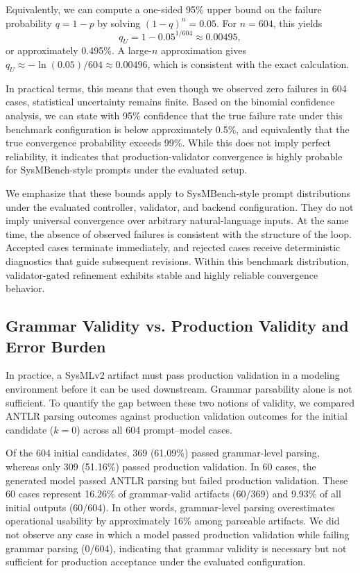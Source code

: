 Equivalently, we can compute a one-sided 95\% upper bound on the failure probability $q=1-p$ by solving $(1-q)^n=0.05$. For $n=604$, this yields
\[
q_U = 1 - 0.05^{1/604} \approx 0.00495,
\]
or approximately 0.495\%. A large-$n$ approximation gives $q_U \approx -\ln(0.05)/604 \approx 0.00496$, which is consistent with the exact calculation. 

In practical terms, this means that even though we observed zero failures in 604 cases, statistical uncertainty remains finite. Based on the binomial confidence analysis, we can state with 95\% confidence that the true failure rate under this benchmark configuration is below approximately 0.5\%, and equivalently that the true convergence probability exceeds 99\%. While this does not imply perfect reliability, it indicates that production-validator convergence is highly probable for SysMBench-style prompts under the evaluated setup.

We emphasize that these bounds apply to SysMBench-style prompt distributions under the evaluated controller, validator, and backend configuration. They do not imply universal convergence over arbitrary natural-language inputs. At the same time, the absence of observed failures is consistent with the structure of the loop. Accepted cases terminate immediately, and rejected cases receive deterministic diagnostics that guide subsequent revisions. Within this benchmark distribution, validator-gated refinement exhibits stable and highly reliable convergence behavior.

\subsection{Grammar Validity vs. Production Validity and Error Burden}

In practice, a SysMLv2 artifact must pass production validation in a modeling environment before it can be used downstream. Grammar parsability alone is not sufficient. To quantify the gap between these two notions of validity, we compared ANTLR parsing outcomes against production validation outcomes for the initial candidate ($k=0$) across all 604 prompt--model cases.

Of the 604 initial candidates, 369 (61.09\%) passed grammar-level parsing, whereas only 309 (51.16\%) passed production validation. In 60 cases, the generated model passed ANTLR parsing but failed production validation. These 60 cases represent 16.26\% of grammar-valid artifacts (60/369) and 9.93\% of all initial outputs (60/604). In other words, grammar-level parsing overestimates operational usability by approximately 16\% among parseable artifacts. We did not observe any case in which a model passed production validation while failing grammar parsing (0/604), indicating that grammar validity is necessary but not sufficient for production acceptance under the evaluated configuration.

